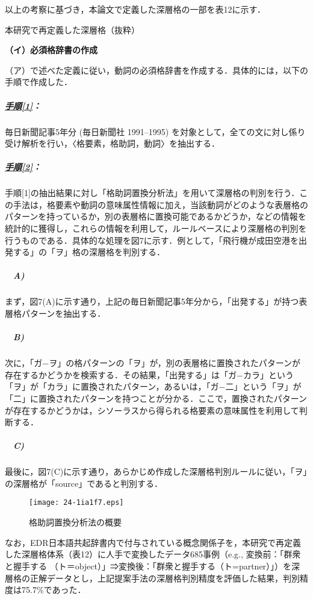 \documentclass[japanese]{jnlp_1.4}
\begin{document}
以上の考察に基づき，本論文で定義した深層格の一部を表12に示す．

\begin{table}[t]
\caption{本研究で再定義した深層格（抜粋）}
\label{table:12}

\end{table}


\noindent\textbf{（イ）必須格辞書の作成}

（ア）で述べた定義に従い，動詞の必須格辞書を作成する．具体的には，以下の手順で作成した．


\subparagraph{\underline{手順[1]}：}毎日新聞記事5年分 (毎日新聞社 1991--1995)\nocite{no46} を対象として，全ての文に対し係り受け解析を行い，〈格要素，格助詞，動詞〉を抽出する．


\subparagraph{\underline{手順[2]}：}手順[1]の抽出結果に対し「格助詞置換分析法」\cite{no47}を用いて深層格の判別を行う．この手法は，格要素や動詞の意味属性情報に加え，当該動詞がどのような表層格のパターンを持っているか，別の表層格に置換可能であるかどうか，などの情報を統計的に獲得し，これらの情報を利用して，ルールベースにより深層格の判別を行うものである．具体的な処理を図7に示す．例として，「飛行機が成田空港を出発する」の「ヲ」格の深層格を判別する．


\subparagraph{　A)}まず，図7(A)に示す通り，上記の毎日新聞記事5年分から，「出発する」が持つ表層格パターンを抽出する．


\subparagraph{　B)}次に，「ガ−ヲ」の格パターンの「ヲ」が，別の表層格に置換されたパターンが存在するかどうかを検索する．その結果，「出発する」は「ガ−カラ」という「ヲ」が「カラ」に置換されたパターン，あるいは，「ガ−二」という「ヲ」が「二」に置換されたパターンを持つことが分かる．ここで，置換されたパターンが存在するかどうかは，シソーラス\cite{no48}から得られる格要素の意味属性を利用して判断する．

\subparagraph{　C)}最後に，図7(C)に示す通り，あらかじめ作成した深層格判別ルールに従い，「ヲ」の深層格が「source」であると判別する．  

\begin{figure}[t]
\begin{center}
\texttt{[image: 24-1ia1f7.eps]}
\end{center}
\caption{格助詞置換分析法\protect\cite{no47}の概要}
\label{fig:7}
\end{figure}

なお，EDR日本語共起辞書内で付与されている概念関係子を，本研究で再定義した深層格体系（表12）に人手で変換したデータ685事例（e.g., 変換前：「群衆と握手する （ト＝object）」⇒変換後：「群衆と握手する（ト=partner）」）を深層格の正解データとし，上記提案手法の深層格判別精度を評価した結果，判別精度は75.7\%であった．
\end{document}

